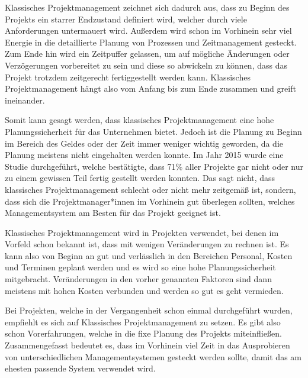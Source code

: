 \label{sec:klassisch}


Klassisches Projektmanagement zeichnet sich dadurch aus, dass zu Beginn des Projekts ein starrer Endzustand definiert wird, welcher durch viele Anforderungen untermauert wird. Außerdem wird schon im Vorhinein sehr viel Energie in die detaillierte Planung von Prozessen und Zeitmanagement gesteckt. Zum Ende hin wird ein Zeitpuffer gelassen, um auf mögliche Änderungen oder Verzögerungen vorbereitet zu sein und diese so abwickeln zu können, dass das Projekt trotzdem zeitgerecht fertiggestellt werden kann. Klassisches Projektmanagement hängt also vom Anfang bis zum Ende zusammen und greift ineinander. \cite{Projectman.}

Somit kann gesagt werden, dass klassisches Projektmanagement eine hohe Planungssicherheit für das Unternehmen bietet. Jedoch ist die Planung zu Beginn im Bereich des Geldes oder der Zeit immer weniger wichtig geworden, da die Planung meistens nicht eingehalten werden konnte. Im Jahr 2015 wurde eine Studie durchgeführt, welche bestätigte, dass 71\% aller Projekte gar nicht oder nur zu einem gewissen Teil fertig gestellt werden konnten. Das sagt nicht, dass klassisches Projektmanagement schlecht oder nicht mehr zeitgemäß ist, sondern, dass sich die Projektmanager*innen im Vorhinein gut überlegen sollten, welches Managementsystem am Besten für das Projekt geeignet ist.  \cite{Projectman.}


Klassisches Projektmanagement wird in Projekten verwendet, bei denen im Vorfeld schon bekannt ist, dass mit wenigen Veränderungen zu rechnen ist. Es kann also von Beginn an gut und verlässlich in den Bereichen Personal, Kosten und Terminen geplant werden und es wird so eine hohe Planungssicherheit mitgebracht. Veränderungen in den vorher genannten Faktoren sind dann meistens mit hohen Kosten verbunden und werden so gut es geht vermieden. \cite{Projectman.}

Bei Projekten, welche in der Vergangenheit schon einmal durchgeführt wurden, empfiehlt es sich auf Klassisches Projektmanagement zu setzen. Es gibt also schon Vorerfahrungen, welche in die fixe Planung des Projekts miteinfließen. Zusammengefasst bedeutet es, dass im Vorhinein viel Zeit in das Ausprobieren von unterschiedlichen Managementsystemen gesteckt werden sollte, damit das am ehesten passende System verwendet wird. \cite{Projectman.}


